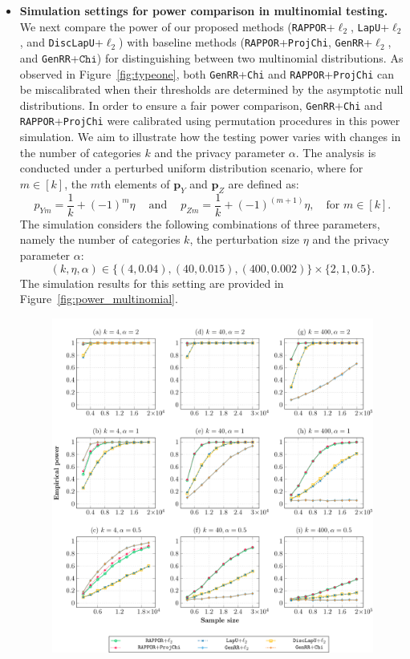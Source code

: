 \documentclass[twoside,11pt]{article}
\newcommand{\rvTwo}{Y}
\newcommand{\rvThree}{Z}
\newcommand{\vectorize}[1]{\mathbf{#1}}
\newcommand{\alphabetSize}{k} %
\newcommand{\vectorIndex}{m}
\newcommand{\probVecElement}[2]{p_{{#1}{#2}}}
\newcommand{\privacyParameter}{\alpha} %
\begin{document}
\begin{itemize}
\item \textbf{Simulation settings for power comparison in multinomial testing.}
We next compare the power of our proposed methods (\texttt{RAPPOR}+$\ell_2$, \texttt{LapU}+$\ell_2$, and \texttt{DiscLapU}+$\ell_2$) with baseline methods (\texttt{RAPPOR}+\texttt{ProjChi}, \texttt{GenRR}+$\ell_2$, and \texttt{GenRR}+$\texttt{Chi}$) for distinguishing between two multinomial distributions. As observed in Figure~\ref{fig:typeone}, both \texttt{GenRR}+\texttt{Chi} and \texttt{RAPPOR}+\texttt{ProjChi} can be miscalibrated when their thresholds are determined by the asymptotic null distributions. In order to ensure a fair power comparison, \texttt{GenRR}+\texttt{Chi} and \texttt{RAPPOR}+\texttt{ProjChi} were calibrated using permutation procedures in this power simulation. We aim to illustrate how the testing power varies with changes in the number of categories  $\alphabetSize$ and the privacy parameter $\privacyParameter$. The analysis is conducted under a perturbed uniform distribution scenario, where for \( m \in [\alphabetSize] \), the \( m \)th elements of \( \vectorize{p}_Y \) and \( \vectorize{p}_Z \) are defined as:
\begin{equation}\label{simulation_setting:perturbed_uniform}
	\probVecElement{\rvTwo}{\vectorIndex} = \frac{1}{\alphabetSize} + (-1)^\vectorIndex \eta~\quad \text{and} \quad~	\probVecElement{\rvThree}{\vectorIndex} = \frac{1}{\alphabetSize} + (-1)^{(\vectorIndex+1)} \eta, \quad \text{for $\vectorIndex \in [\alphabetSize]$.}
\end{equation}
The simulation considers the following combinations of three parameters, namely the number of categories $\alphabetSize$, the perturbation size $\eta$ and the privacy parameter $\privacyParameter$: 
$$(\alphabetSize, \eta, \privacyParameter) \in \{(4,0.04), (40,0.015), (400,0.002)\} \times \{2, 1, 0.5\}.$$ The simulation results for this setting are provided in Figure~\ref{fig:power_multinomial}. 
\begin{figure}[t!]
	\centering
	\includegraphics[width=0.95\linewidth]{perturbunif.pdf}

\end{figure}
\end{itemize}
\end{document}
